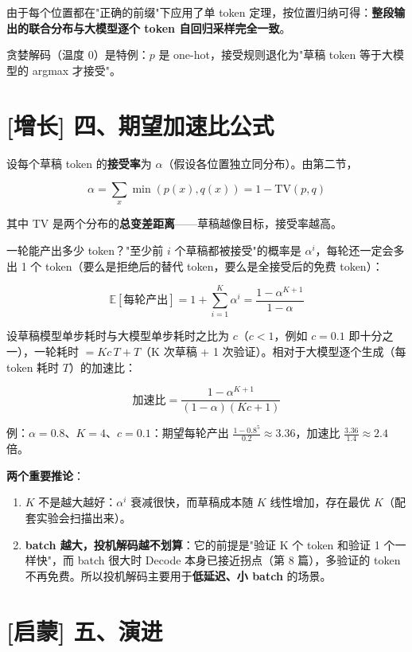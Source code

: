 由于每个位置都在"正确的前缀"下应用了单 token 定理，按位置归纳可得：\textbf{整段输出的联合分布与大模型逐个 token 自回归采样完全一致}。

\begin{noteBox}[核心导读与背景]
贪婪解码（温度 0）是特例：$p$ 是 one-hot，接受规则退化为"草稿 token 等于大模型的 argmax 才接受"。
\end{noteBox}

\section{[增长] 四、期望加速比公式}

设每个草稿 token 的\textbf{接受率}为 $\alpha$（假设各位置独立同分布）。由第二节，

\[
\alpha = \sum_x \min(p(x), q(x)) = 1 - \text{TV}(p, q)
\]

其中 TV 是两个分布的\textbf{总变差距离}——草稿越像目标，接受率越高。

一轮能产出多少 token？"至少前 $i$ 个草稿都被接受"的概率是 $\alpha^i$，每轮还一定会多出 1 个 token（要么是拒绝后的替代 token，要么是全接受后的免费 token）：

\[
\mathbb{E}[\text{每轮产出}] = 1 + \sum_{i=1}^{K} \alpha^i = \frac{1 - \alpha^{K+1}}{1 - \alpha}
\]

设草稿模型单步耗时与大模型单步耗时之比为 $c$（$c < 1$，例如 $c = 0.1$ 即十分之一），一轮耗时 $= K c \, T + T$（K 次草稿 + 1 次验证）。相对于大模型逐个生成（每 token 耗时 $T$）的加速比：

\[
\text{加速比} = \frac{1 - \alpha^{K+1}}{(1 - \alpha)(Kc + 1)}
\]

例：$\alpha = 0.8$、$K = 4$、$c = 0.1$：期望每轮产出 $\frac{1 - 0.8^5}{0.2} \approx 3.36$，加速比 $\frac{3.36}{1.4} \approx 2.4$ 倍。

\textbf{两个重要推论}：
\begin{enumerate}
  \item $K$ 不是越大越好：$\alpha^i$ 衰减很快，而草稿成本随 $K$ 线性增加，存在最优 $K$（配套实验会扫描出来）。
  \item \textbf{batch 越大，投机解码越不划算}：它的前提是"验证 K 个 token 和验证 1 个一样快"，而 batch 很大时 Decode 本身已接近拐点（第 8 篇），多验证的 token 不再免费。所以投机解码主要用于\textbf{低延迟、小 batch} 的场景。
\end{enumerate}

\section{[启蒙] 五、演进}

